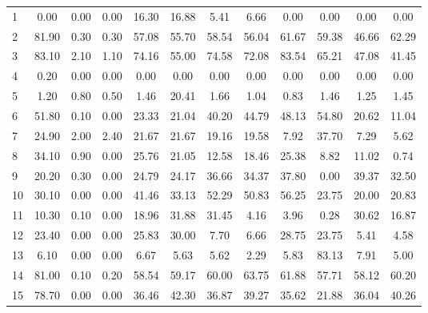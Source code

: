 \documentclass[12pt]{article}
\begin{document}
\begin{table*}[htbp]
\begin{tabular}{ | l || c | c | c || c |c |c|c|| c | c | c|c| }
1   &   0.00    &   0.00    &   0.00    &   16.30   &   16.88   &   5.41    &   6.66    &   0.00    &   0.00    &   0.00    &   0.00\\   
2   &   81.90   &   0.30    &   0.30    &   57.08   &   55.70   &   58.54   &   56.04   &   61.67   &   59.38   &   46.66   &   62.29 \\ 
3   &   83.10   &   2.10    &   1.10    &   74.16   &   55.00   &   74.58   &   72.08   &   83.54   &   65.21   &   47.08   &   41.45  \\
4   &   0.20    &   0.00    &   0.00    &   0.00    &   0.00    &   0.00    &   0.00    &   0.00    &   0.00    &   0.00    &   0.00   \\
5   &   1.20    &   0.80    &   0.50    &   1.46    &   20.41   &   1.66    &   1.04    &   0.83    &   1.46    &   1.25    &   1.45   \\
6   &   51.80   &   0.10    &   0.00    &   23.33   &   21.04   &   40.20   &   44.79   &   48.13   &   54.80   &   20.62   &   11.04  \\
7   &   24.90   &   2.00    &   2.40    &   21.67   &   21.67   &   19.16   &   19.58   &   7.92    &   37.70   &   7.29    &   5.62   \\
8   &   34.10   &   0.90    &   0.00    &   25.76   &   21.05   &   12.58   &   18.46   &   25.38   &   8.82    &   11.02   &   0.74   \\
9   &   20.20   &   0.30    &   0.00    &   24.79   &   24.17   &   36.66   &   34.37   &   37.80   &   0.00    &   39.37   &   32.50  \\
10  &   30.10   &   0.00    &   0.00    &   41.46   &   33.13   &   52.29   &   50.83   &   56.25   &   23.75   &   20.00   &   20.83  \\
11  &   10.30   &   0.10    &   0.00    &   18.96   &   31.88   &   31.45   &   4.16    &   3.96    &   0.28    &   30.62   &   16.87  \\
12  &   23.40   &   0.00    &   0.00    &   25.83   &   30.00   &   7.70    &   6.66    &   28.75   &   23.75   &   5.41    &   4.58   \\
13  &   6.10    &   0.00    &   0.00    &   6.67    &   5.63    &   5.62    &   2.29    &   5.83    &   83.13   &   7.91    &   5.00   \\
14  &   81.00   &   0.10    &   0.20    &   58.54   &   59.17   &   60.00   &   63.75   &   61.88   &   57.71   &   58.12   &   60.20  \\
15  &   78.70   &   0.00    &   0.00    &   36.46   &   42.30   &   36.87   &   39.27   &   35.62   &   21.88   &   36.04   &   40.26  \\

\end{tabular}
\end{table*}
\end{document}
